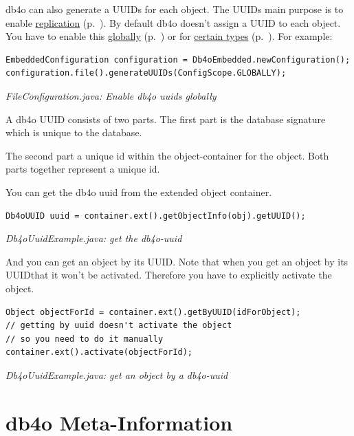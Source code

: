 db4o can also generate a UUIDs for each object. The UUIDs main purpose is to enable \hyperref[drs:welcome]{replication} (p.~\pageref{drs:welcome}). By default db4o doesn't assign a UUID to each object. You have to enable this \hyperref[ref:configuration-file-generate-uuids]{globally} (p.~\pageref{ref:configuration-file-generate-uuids}) or for \hyperref[ref:configuration-objectclass-generate-uuid]{certain types} (p.~\pageref{ref:configuration-objectclass-generate-uuid}). For example:

\begin{lstlisting}
EmbeddedConfiguration configuration = Db4oEmbedded.newConfiguration();
configuration.file().generateUUIDs(ConfigScope.GLOBALLY);
\end{lstlisting}

{\small\itshape FileConfiguration.java: Enable db4o uuids globally\par}
\medskip

A db4o UUID consists of two parts. The first part is the database signature which is unique to the database.

The second part a unique id within the object-container for the object. Both parts together represent a unique id.

You can get the db4o uuid from the extended object container.

\begin{lstlisting}
Db4oUUID uuid = container.ext().getObjectInfo(obj).getUUID();
\end{lstlisting}

{\small\itshape Db4oUuidExample.java: get the db4o-uuid\par}
\medskip

And you can get an object by its UUID. Note that when you get an object by its UUIDthat it won't be activated. Therefore you have to explicitly activate the object.

\begin{lstlisting}
Object objectForId = container.ext().getByUUID(idForObject);
// getting by uuid doesn't activate the object
// so you need to do it manually
container.ext().activate(objectForId);
\end{lstlisting}

{\small\itshape Db4oUuidExample.java: get an object by a db4o-uuid\par}
\medskip

\section{db4o Meta-Information}
\label{ref:advanced-topics-db4o-meta-information}

